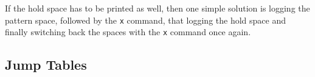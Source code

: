 If the hold space has to be printed as well, then one simple solution is
logging the pattern space, followed by the {\tt x} command, that logging
the hold space and finally switching back the spaces with the {\tt x}
command once again.


\subsection{Jump Tables}

